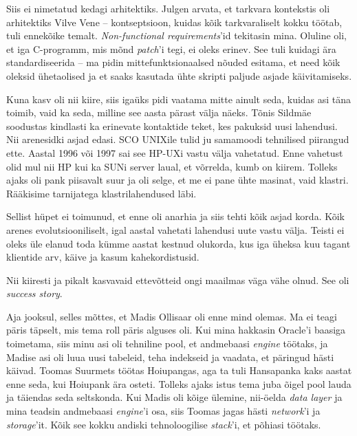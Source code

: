 Siis ei nimetatud kedagi arhitektiks. Julgen arvata, et 
tarkvara kontekstis oli arhitektiks Vilve Vene -- kontseptsioon, kuidas kõik tarkvaraliselt kokku töötab, tuli 
ennekõike temalt. \emph{Non-functional requirements}'id tekitasin mina. 
Oluline oli, et iga C-programm, mis mõnd \emph{patch}'i tegi, ei 
oleks erinev. See tuli kuidagi ära standardiseerida -- ma pidin 
mittefunktsionaalsed nõuded esitama, et need kõik oleksid ühetaolised ja et 
saaks kasutada ühte skripti paljude asjade käivitamiseks.


Kuna kasv oli nii kiire, siis igaüks pidi vaatama mitte ainult 
seda, kuidas asi täna toimib, vaid ka seda, milline see 
aasta pärast välja näeks. Tõnis Sildmäe 
soodustas kindlasti ka erinevate kontaktide teket, kes 
pakuksid uusi lahendusi. Nii arenesidki
asjad edasi. SCO UNIXile tulid ju samamoodi tehnilised piirangud 
ette. Aastal 1996 või 1997 sai see HP-UXi vastu välja vahetatud. Enne 
vahetust olid mul nii HP kui ka SUNi server laual, et võrrelda, kumb on
kiirem. Tolleks ajaks oli pank piisavalt suur ja oli selge, et me ei 
pane ühte masinat, vaid klastri. Rääkisime tarnijatega 
klastrilahendused läbi.

Sellist hüpet ei toimunud, et enne oli anarhia ja siis tehti kõik asjad 
korda. Kõik arenes evolutsiooniliselt, igal aastal vahetati lahendusi uute 
vastu välja. Teisti ei oleks üle elanud toda kümme aastat kestnud olukorda, 
kus iga üheksa kuu tagant klientide arv, käive ja
kasum kahekordistusid.


Nii kiiresti ja pikalt kasvavaid ettevõtteid ongi maailmas väga vähe olnud. See oli \emph{success story}.


Aja jooksul, selles mõttes, et Madis Ollisaar oli 
enne mind olemas. Ma ei teagi päris täpselt, mis tema roll päris alguses oli. 
Kui mina hakkasin Oracle'i baasiga toimetama, siis minu 
asi oli tehniline pool, et andmebaasi \emph{engine} töötaks, ja Madise 
asi oli luua uusi tabeleid, teha indekseid ja vaadata, et päringud hästi 
käivad. Toomas 
Suurmets töötas Hoiupangas, aga 
ta tuli Hansapanka kaks aastat enne seda, kui Hoiupank ära osteti. 
Tolleks ajaks istus tema juba õigel pool lauda ja täiendas seda seltskonda. Kui 
Madis oli kõige ülemine, nii-öelda \emph{data layer} ja mina teadsin 
andmebaasi \emph{engine}'i osa, siis Toomas jagas hästi \emph{network}'i 
ja \emph{storage}'it. Kõik see kokku andiski tehnoloogilise 
\emph{stack}'i, et põhiasi töötaks.

